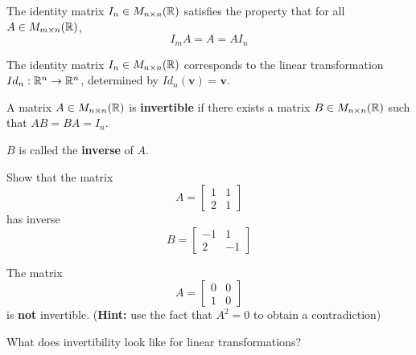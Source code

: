 \begin{proposition}
    The identity matrix $I_n \in M_{n \times n}(\mathbb{R})$ satisfies the property that for all $A \in M_{m \times n}(\mathbb{R})$, $$I_mA = A = AI_n$$
\end{proposition}

\begin{proposition}
    The identity matrix $I_n \in M_{n \times n}(\mathbb{R})$ corresponds to the linear transformation $Id_n : \mathbb{R}^n \to \mathbb{R}^n$, determined by $Id_n (\bm{v}) = \bm{v}$.
\end{proposition}











\begin{definition}
    A matrix $A\in M_{n \times n}(\mathbb{R})$ is \textbf{invertible} if there exists a matrix $B\in M_{n \times n}(\mathbb{R})$ such that $AB = BA = I_n$.
    
    $B$ is called the \textbf{inverse} of $A$.
    \end{definition}

\begin{example}
    Show that the matrix \begin{equation*}
A = 
\begin{bmatrix}
1 & 1 \\
2 & 1
\end{bmatrix}
\end{equation*}
has inverse \begin{equation*}
B = 
\begin{bmatrix}
-1 & 1 \\
2 & -1
\end{bmatrix}
\end{equation*}
\end{example}

\begin{example}
    The matrix  \begin{equation*}
A = 
\begin{bmatrix}
0 & 0 \\
1 & 0
\end{bmatrix}
\end{equation*} is \textbf{not} invertible. (\textbf{Hint:} use the fact that $A^2 = 0$ to obtain a contradiction)
\end{example}

\begin{motivating}
What does invertibility look like for linear transformations?
\end{motivating}

